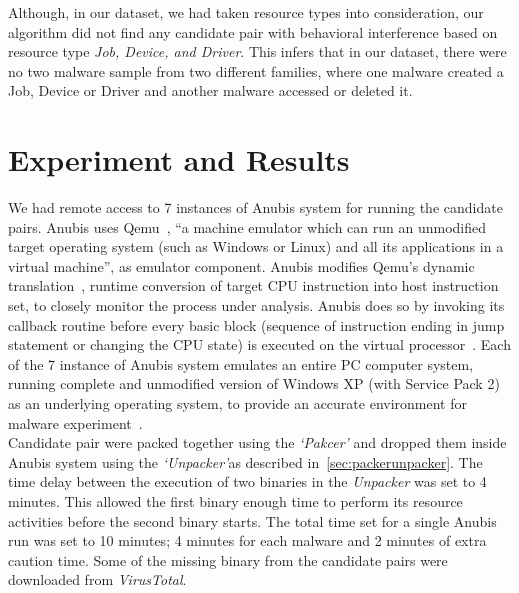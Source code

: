 Although, in our dataset, we had taken resource types {\getresourcetypes{}} into consideration, our algorithm did not find any candidate pair with behavioral interference based on resource type \emph{Job, Device, and Driver}.
This infers that in our dataset, there were no two malware sample from two different families, where one malware created a Job, Device or Driver and another malware accessed or deleted it.
\section{Experiment and Results}
\label{sec:Experiment and Results}
We had remote access to 7 instances of Anubis system for running the candidate pairs.
Anubis uses Qemu~\cite[]{qemu}, ``a machine emulator which can run an unmodified target operating system (such as Windows or Linux) and all its applications in a virtual machine'', as emulator component.
Anubis modifies Qemu's dynamic translation~\cite[]{qemu}, runtime conversion of target CPU instruction into host instruction set, to closely monitor the process under analysis.
Anubis does so by invoking its callback routine before every basic block (sequence of instruction ending in jump statement or changing the CPU state) is executed on the virtual processor~\cite[]{ttanalyze}.
Each of the 7 instance of Anubis system emulates an entire PC computer system, running complete and unmodified version of Windows XP (with Service Pack 2) as an underlying operating system, to provide an accurate environment for malware experiment~\cite[]{ttanalyze}.
\\

Candidate pair were packed together using the \emph{`Pakcer'} and dropped them inside Anubis system using the \emph{`Unpacker'}as described in~\ref{sec:packerunpacker}.
The time delay between the execution of two binaries in the \emph{Unpacker} was set to 4 minutes.
This allowed the first binary enough time to perform its resource activities before the second binary starts.
The total time set for a single Anubis run was set to 10 minutes; 4 minutes for each malware and 2 minutes of extra caution time.
Some of the missing binary from the candidate pairs were downloaded from \emph{VirusTotal}.\\

